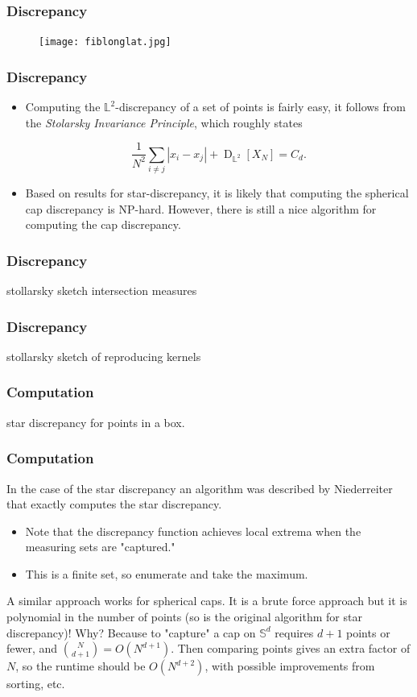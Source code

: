 \documentclass{beamer}
\theoremstyle{definition}
\begin{document}
%




\frame
{
\frametitle{Discrepancy}

 


\begin{figure}[htbp]
   \centering
   \texttt{[image: fiblonglat.jpg]} %
\end{figure}


}


\frame
{
\frametitle{Discrepancy}
\begin{itemize}
\item Computing the $\mathbb{L}^2$-discrepancy of a set of points is fairly easy, it follows from the \emph{Stolarsky Invariance Principle}, which roughly states 

\[
\frac{1}{N^2}\sum_{i\ne j}|x_i-x_j| + \operatorname{D}_{\mathbb{L}^2}[X_N] = C_d.
\]

\item Based on results for star-discrepancy, it is likely that computing the spherical cap discrepancy is NP-hard.  However, there is still a nice algorithm for computing the cap discrepancy.
\end{itemize}
}


\frame
{
\frametitle{Discrepancy}
stollarsky sketch intersection measures
}




\frame
{
\frametitle{Discrepancy}
stollarsky sketch of reproducing kernels
}



\frame
{
\frametitle{Computation}
star discrepancy for points in a box.
}



\frame
{
\frametitle{Computation}
In the case of the star discrepancy an algorithm was described by Niederreiter that exactly computes the star discrepancy.  

\begin{itemize}
\item Note that the discrepancy function achieves local extrema when the measuring sets are "captured."
\item This is a finite set, so enumerate and take the maximum. 
\end{itemize}

A similar approach works for spherical caps.  It is a brute force approach but it is polynomial in the number of points (so is the original algorithm for star discrepancy)!  Why?  Because to "capture" a cap on $\mathbb{S}^d$ requires $d+1$ points or fewer, and $N \choose{d+1}$$=O(N^{d+1})$.  Then comparing points gives an extra factor of $N$, so the runtime should be $O(N^{d+2})$, with possible improvements from sorting, etc.


}
\end{document}
